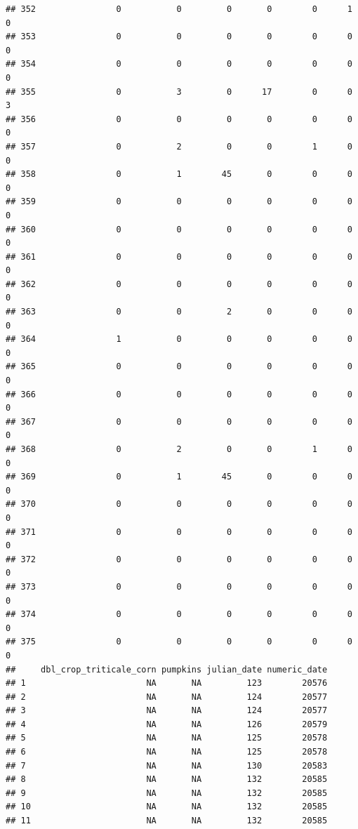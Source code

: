 \documentclass[
]{article}
\begin{document}
\begin{verbatim}
## 352                0           0         0       0        0      1      0
## 353                0           0         0       0        0      0      0
## 354                0           0         0       0        0      0      0
## 355                0           3         0      17        0      0      3
## 356                0           0         0       0        0      0      0
## 357                0           2         0       0        1      0      0
## 358                0           1        45       0        0      0      0
## 359                0           0         0       0        0      0      0
## 360                0           0         0       0        0      0      0
## 361                0           0         0       0        0      0      0
## 362                0           0         0       0        0      0      0
## 363                0           0         2       0        0      0      0
## 364                1           0         0       0        0      0      0
## 365                0           0         0       0        0      0      0
## 366                0           0         0       0        0      0      0
## 367                0           0         0       0        0      0      0
## 368                0           2         0       0        1      0      0
## 369                0           1        45       0        0      0      0
## 370                0           0         0       0        0      0      0
## 371                0           0         0       0        0      0      0
## 372                0           0         0       0        0      0      0
## 373                0           0         0       0        0      0      0
## 374                0           0         0       0        0      0      0
## 375                0           0         0       0        0      0      0
##     dbl_crop_triticale_corn pumpkins julian_date numeric_date
## 1                        NA       NA         123        20576
## 2                        NA       NA         124        20577
## 3                        NA       NA         124        20577
## 4                        NA       NA         126        20579
## 5                        NA       NA         125        20578
## 6                        NA       NA         125        20578
## 7                        NA       NA         130        20583
## 8                        NA       NA         132        20585
## 9                        NA       NA         132        20585
## 10                       NA       NA         132        20585
## 11                       NA       NA         132        20585

\end{verbatim}
\end{document}
